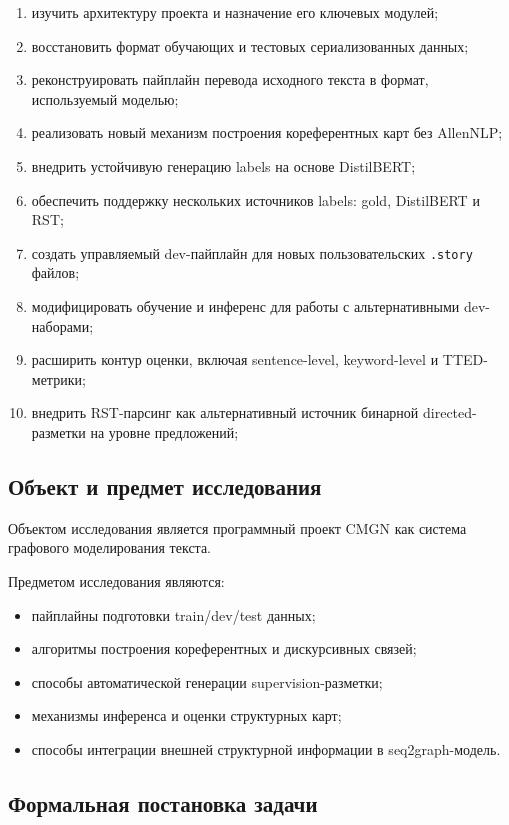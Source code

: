 \documentclass[12pt,a4paper]{article}
\begin{document}
\begin{enumerate}
    \item изучить архитектуру проекта и назначение его ключевых модулей;
    \item восстановить формат обучающих и тестовых сериализованных данных;
    \item реконструировать пайплайн перевода исходного текста в формат, используемый
    моделью;
    \item реализовать новый механизм построения кореферентных карт без AllenNLP;
    \item внедрить устойчивую генерацию labels на основе DistilBERT;
    \item обеспечить поддержку нескольких источников labels: gold, 
    DistilBERT и RST;
    \item создать управляемый dev-пайплайн для новых пользовательских \texttt{.story}
    файлов;
    \item модифицировать обучение и инференс для работы с альтернативными dev-наборами;
    \item расширить контур оценки, включая sentence-level, keyword-level и TTED-метрики;
    \item внедрить RST-парсинг как альтернативный источник бинарной directed-разметки на
    уровне предложений;
\end{enumerate}

\subsection{Объект и предмет исследования}

Объектом исследования является программный проект CMGN как система графового
моделирования текста.

Предметом исследования являются:

\begin{itemize}
    \item пайплайны подготовки train/dev/test данных;
    \item алгоритмы построения кореферентных и дискурсивных связей;
    \item способы автоматической генерации supervision-разметки;
    \item механизмы инференса и оценки структурных карт;
    \item способы интеграции внешней структурной информации в seq2graph-модель.
\end{itemize}

\subsection{Формальная постановка задачи}
\end{document}
